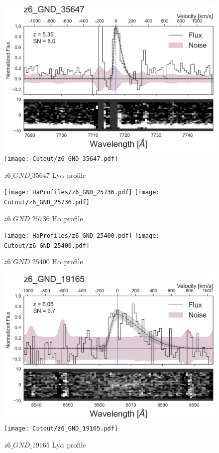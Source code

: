 \documentclass[12pt,english]{article}
\begin{document}
\begin{figure}
\begin{center}\includegraphics[width=12cm, trim=0.1cm 0cm 0cm -1cm]{LyaProfiles/z6_GND_35647.png}
\texttt{[image: Cutout/z6\_GND\_35647.pdf]}
\caption{$z6\_GND\_35647$ Ly$\alpha$ profile}
\end{center}
\end{figure}
\clearpage
\begin{figure}
\begin{center}\texttt{[image: HaProfiles/z6\_GND\_25736.pdf]}
\texttt{[image: Cutout/z6\_GND\_25736.pdf]}
\caption{$z6\_GND\_25736$ H$\alpha$ profile}
\end{center}
\end{figure}
\clearpage
\begin{figure}
\begin{center}\texttt{[image: HaProfiles/z6\_GND\_25400.pdf]}
\texttt{[image: Cutout/z6\_GND\_25400.pdf]}
\caption{$z6\_GND\_25400$ H$\alpha$ profile}
\end{center}
\end{figure}
\clearpage
\begin{figure}
\begin{center}\includegraphics[width=12cm, trim=0.1cm 0cm 0cm -1cm]{LyaProfiles/z6_GND_19165.png}
\texttt{[image: Cutout/z6\_GND\_19165.pdf]}
\caption{$z6\_GND\_19165$ Ly$\alpha$ profile}
\end{center}
\end{figure}
\end{document}

